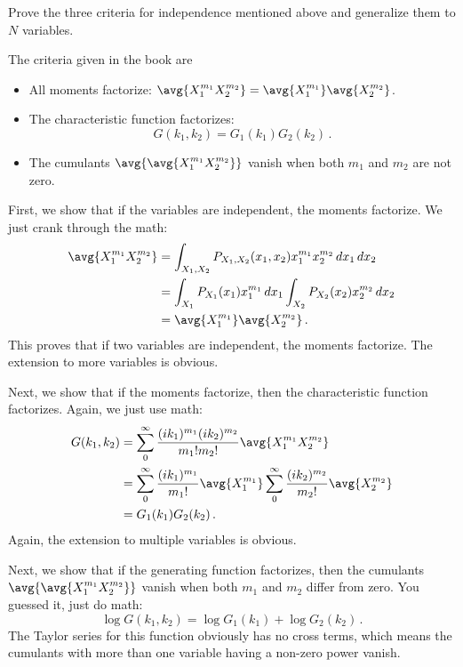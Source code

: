 

Prove the three criteria for independence mentioned above and generalize them to $N$ variables.

The criteria given in the book are
\begin{itemize}
\item All moments factorize: $\avg{X_1^{m_1} X_2^{m_2}} = \avg{X_1^{m_1}} \avg{X_2^{m_2}}$.
\item The characteristic function factorizes:
\begin{equation*}
G(k_1, k_2) = G_1(k_1)G_2(k_2) \, .
\end{equation*}
\item The cumulants $\avg{\avg{X_1^{m_1} X_2^{m_2}}}$ vanish when both $m_1$ and $m_2$ are not zero.
\end{itemize}


First, we show that if the variables are independent, the moments factorize.
We just crank through the math:
\begin{align*}
\avg{X_1^{m_1} X_2^{m_2}}
&= \int_{X_1,X_2} P_{X_1, X_2}(x_1, x_2) x_1^{m_1} x_2^{m_2} \, dx_1 \, dx_2 \\
&= \int_{X_1} P_{X_1}(x_1) x_1^{m_1} \, dx_1 \int_{X_2} P_{X_2}(x_2) x_2^{m_2} \, dx_2 \\
&= \avg{X_1^{m_1}} \avg{X_2^{m_2}} \, .
\end{align*}
This proves that if two variables are independent, the moments factorize.
The extension to more variables is obvious.

Next, we show that if the moments factorize, then the characteristic function factorizes.
Again, we just use math:
\begin{align*}
G(k_1, k_2)
&= \sum_0^{\infty} \frac{(ik_1)^{m_1} (ik_2)^{m_2}}{m_1! m_2!} \avg{X_1^{m_1} X_2^{m_2}} \\
&=
\sum_0^{\infty} \frac{(ik_1)^{m_1}}{m_1!} \avg{X_1^{m_1}}
\sum_0^{\infty} \frac{(ik_2)^{m_2}}{m_2!} \avg{X_2^{m_2}} \\
&= G_1(k_1) G_2(k_2) \, .
\end{align*}
Again, the extension to multiple variables is obvious.

Next, we show that if the generating function factorizes, then the cumulants $\avg{\avg{X_1^{m_1} X_2^{m_2}}}$ vanish when both $m_1$ and $m_2$ differ from zero.
You guessed it, just do math:
\begin{equation*}
\log G(k_1, k_2)
= \log G_1(k_1) + \log G_2(k_2) \, .
\end{equation*}
The Taylor series for this function obviously has no cross terms, which means the cumulants with more than one variable having a non-zero power vanish.


